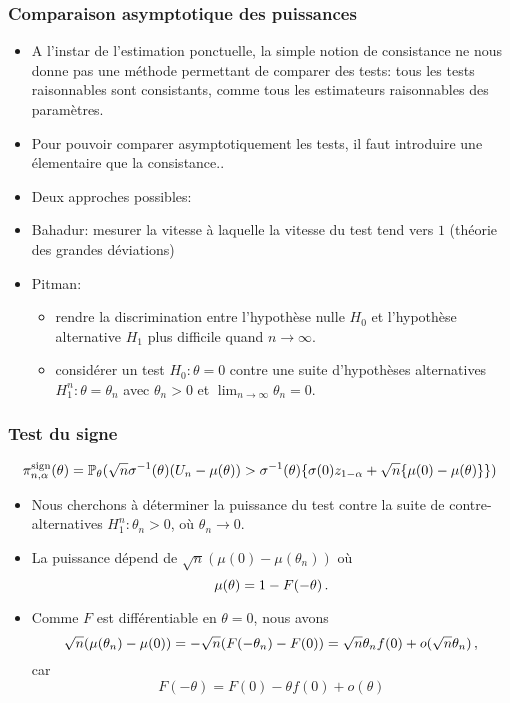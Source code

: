 \begin{frame}
\frametitle{Comparaison asymptotique des puissances}
\begin{itemize}
\item A l'instar de l'estimation ponctuelle, la simple notion de \alert{consistance} ne nous donne pas une méthode permettant de \alert{comparer} des tests: tous les tests \alert{raisonnables} sont consistants, comme tous les estimateurs \alert{raisonnables}  des paramètres.
\item Pour pouvoir comparer asymptotiquement les tests, il faut introduire une élementaire que la consistance..
\item Deux approches possibles:
\item \alert{Bahadur}: mesurer la vitesse à laquelle la vitesse du test tend vers $1$ (théorie des \alert{grandes déviations})
\item \alert{Pitman}:
\begin{itemize}
\item rendre la discrimination entre l'hypothèse nulle $H_0$ et l'hypothèse alternative $H_1$ plus \alert{difficile} quand $n \to \infty$.
\item \alert{considérer un test $H_0: \theta = 0$ contre \alert{une suite d'hypothèses alternatives} $H^n_1: \theta = \theta_n$ avec $\theta_n > 0$ et $\lim_{n \to \infty} \theta_n = 0$.}
\end{itemize}
\end{itemize}
\end{frame}

\begin{frame}
\frametitle{Test du signe}
$$
\pi^{\mathrm{sign}}_{n,\alpha}(\theta)=
\operatorname{{\mathbb P}}_\theta( \sqrt{n} \sigma^{-1}(\theta) (U_n - \mu(\theta)) > \sigma^{-1}(\theta) \{ \sigma(0) z_{1-\alpha} + \sqrt{n} \{\mu(0)-\mu(\theta)\}\})
$$
\begin{itemize}
\item  Nous cherchons à déterminer la puissance du test contre la suite de contre-alternatives $H_1^n: \theta_n > 0$, où $\theta_n \to 0$.
\item La puissance dépend de $\sqrt{n} (\mu(0) - \mu(\theta_n))$ où
\[
\mu(\theta) = 1 - F(-\theta) \,.
\]
\item Comme $F$ est différentiable en $\theta = 0$, nous avons
\[
\sqrt{n}(\mu(\theta_n) - \mu(0))= - \sqrt{n} ( F(-\theta_n) - F(0)) =  \sqrt{n} \theta_n f(0) + o(\sqrt{n} \theta_n) \,,
\]
car
\[
F(-\theta) = F(0) - \theta f(0) + o(\theta)
\]
\end{itemize}
\end{frame}


